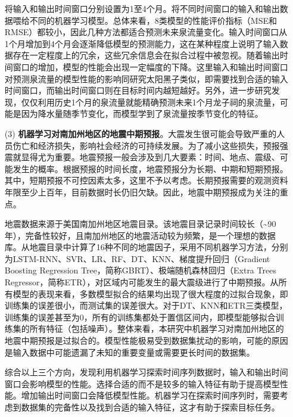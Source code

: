 \begin{enumerate}
  将输入和输出时间窗口分别设置为1至4个月。将不同时间窗口的输入和输出数据喂给不同的机器学习模型。总体来看，8类模型的性能评价指标（MSE和RMSE）都较小，因此几种方法都适合预测未来泉流量变化。输入时间窗口从1个月增加到4个月会逐渐降低模型的预测能力，这在某种程度上说明了输入数据存在一定程度上的冗余，这些冗余信息会在拟合过程中被忽视。随着输出时间窗口的增加，模型的性能会出现一定幅度的下降。这里输入和输出时间窗口对预测泉流量的模型性能的影响同研究太阳黑子类似，即需要找到合适的输入时间窗口，而输出时间窗口则在目标时间内越短越好。另外，进一步研究发现，仅仅利用历史1个月的泉流量就能精确预测未来1个月龙子祠的泉流量，可能是因为降水量随季节变化，而模型学到了泉流量按季节变化的特征。
  
  \item[(3)] \textbf{机器学习对南加州地区的地震中期预报}。大震发生很可能会导致严重的人员伤亡和经济损失，影响社会经济的可持续发展。为了减小这些损失，预报强震就显得尤为重要。地震预报一般会涉及到几大要素：时间、地点、震级、可能发生的概率。根据预报的时间长度，地震预报分为长期、中期和短期预报。其中，短期预报不可控因素太多，这里不予以考虑。长期预报需要的观测资料年限至少上百年，目前数据时长仍旧欠缺。因此，地震中期预报成为关注的重点。
  
  地震数据来源于美国南加州地区地震目录。该地震目录记录时间较长（\sim 90年），完备性较好，且南加州地区的地震活动较为频繁，是一个理想的数据库。从地震目录中计算了16种不同的地震因子，采用不同机器学习方法，分别为LSTM-RNN、SVR、LR、RF、DT、KNN、梯度提升回归（Gradient Boosting Regression Tree，简称GBRT）、极端随机森林回归（Extra Trees Regressor，简称ETR），对区域内可能发生的最大震级进行了中期预报。从所有模型的表现来看，多数模型拟合的结果均出现了很大程度的过拟合现象，即训练集的误差很小，而测试集的误差很大。对于DT、KNN和ETR三类模型，训练集的误差甚至为0，所有的训练集都处于置信区间内，即模型能够拟合训练集的所有特征（包括噪声）。整体来看，本研究中机器学习对南加州地区的地震中期预报是过拟合的。模型性能极易受到数据集扰动的影响，可能的原因是输入数据中可能遗漏了未知的重要变量或需要更长时间的数据集。

  综合以上三个方向，发现利用机器学习探索时间序列数据时，输入和输出时间窗口会影响模型的性能。选择合适的而不是较多的输入特征有助于提高模型性能。增加输出时间窗口会降低模型性能。机器学习在探索时间序列时，需要考虑到数据集的完备性以及找到合适的输入特征，这才有助于探索目标任务。

\end{enumerate}


